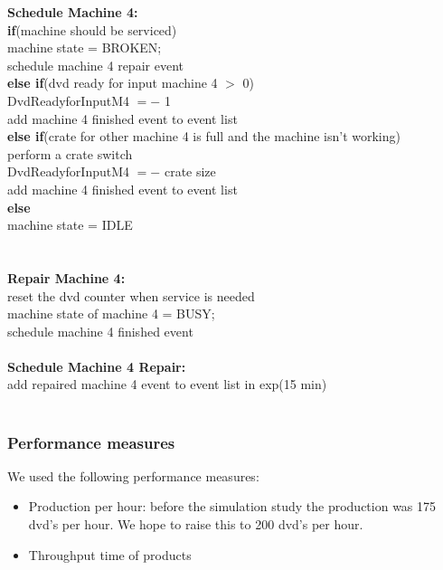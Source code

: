 \documentclass[11pt,a4paper]{article}
\newcommand{\tab}{\hspace*{2em}}
\begin{document}
\noindent \textbf{Schedule Machine 4:} \textbraceleft\\ 
	\tab \textbf{if}(machine should be serviced) \textbraceleft \\
	\tab \tab machine state = BROKEN; \\
	\tab \tab schedule machine 4 repair event \\
	\tab \textbraceright \textbf{else if}(dvd ready for input machine 4 $>$ 0) \textbraceleft \\
	\tab \tab DvdReadyforInputM4 $=-$ 1 \\
	\tab \tab add machine 4 finished event to event list \\
	\tab \textbraceright \textbf{else if}(crate for other machine 4 is full and the machine isn't working) \textbraceleft \\
	\tab \tab perform a crate switch \\
	\tab \tab DvdReadyforInputM4 $=-$ crate size \\
	\tab \tab add machine 4 finished event to event list\\
	\tab \textbraceright \textbf{else} \textbraceleft \\
	\tab \tab machine state = IDLE \\
	\tab \textbraceright \\
\textbraceright \\

\noindent \textbf{Repair Machine 4:} \textbraceleft\\ 
	\tab reset the dvd counter when service is needed \\
	\tab machine state of machine 4 = BUSY; \\
	\tab schedule machine 4 finished event \\
\textbraceright \\

\noindent \textbf{Schedule Machine 4 Repair:} \textbraceleft\\ 
	\tab add repaired machine 4 event to event list in exp(15 min) \\
\textbraceright \\


	

\subsubsection{Performance measures}
We used the following performance measures:
\begin{itemize}
\item Production per hour: before the simulation study the production was 175 dvd's per hour. We hope to raise this to 200 dvd's per hour. 
\item Throughput time of products 
\end {itemize}
\end{document}
